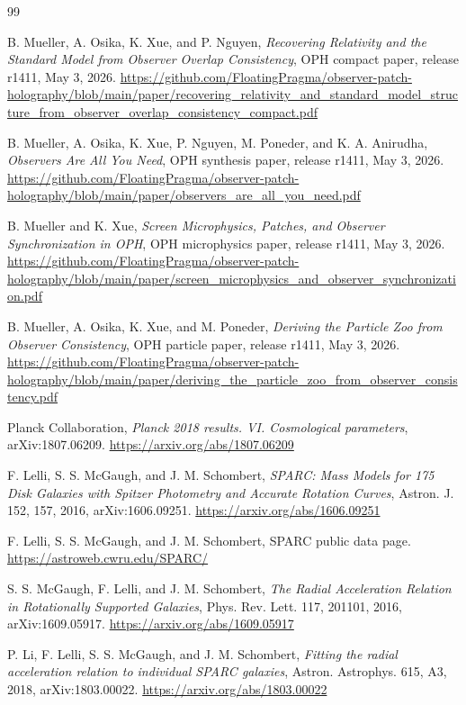 \documentclass[11pt]{article}
\begin{document}
\begin{thebibliography}{99}

B. Mueller, A. Osika, K. Xue, and P. Nguyen,
\emph{Recovering Relativity and the Standard Model from Observer Overlap Consistency},
OPH compact paper, release r1411, May 3, 2026.
\url{https://github.com/FloatingPragma/observer-patch-holography/blob/main/paper/recovering_relativity_and_standard_model_structure_from_observer_overlap_consistency_compact.pdf}

B. Mueller, A. Osika, K. Xue, P. Nguyen, M. Poneder, and K. A. Anirudha,
\emph{Observers Are All You Need}, OPH synthesis paper, release r1411,
May 3, 2026.
\url{https://github.com/FloatingPragma/observer-patch-holography/blob/main/paper/observers_are_all_you_need.pdf}

B. Mueller and K. Xue,
\emph{Screen Microphysics, Patches, and Observer Synchronization in OPH},
OPH microphysics paper, release r1411, May 3, 2026.
\url{https://github.com/FloatingPragma/observer-patch-holography/blob/main/paper/screen_microphysics_and_observer_synchronization.pdf}

B. Mueller, A. Osika, K. Xue, and M. Poneder,
\emph{Deriving the Particle Zoo from Observer Consistency},
OPH particle paper, release r1411, May 3, 2026.
\url{https://github.com/FloatingPragma/observer-patch-holography/blob/main/paper/deriving_the_particle_zoo_from_observer_consistency.pdf}

Planck Collaboration,
\emph{Planck 2018 results. VI. Cosmological parameters},
arXiv:1807.06209.
\url{https://arxiv.org/abs/1807.06209}

F. Lelli, S. S. McGaugh, and J. M. Schombert,
\emph{SPARC: Mass Models for 175 Disk Galaxies with Spitzer Photometry and Accurate Rotation Curves},
Astron. J. 152, 157, 2016, arXiv:1606.09251.
\url{https://arxiv.org/abs/1606.09251}

F. Lelli, S. S. McGaugh, and J. M. Schombert,
SPARC public data page.
\url{https://astroweb.cwru.edu/SPARC/}

S. S. McGaugh, F. Lelli, and J. M. Schombert,
\emph{The Radial Acceleration Relation in Rotationally Supported Galaxies},
Phys. Rev. Lett. 117, 201101, 2016, arXiv:1609.05917.
\url{https://arxiv.org/abs/1609.05917}

P. Li, F. Lelli, S. S. McGaugh, and J. M. Schombert,
\emph{Fitting the radial acceleration relation to individual SPARC galaxies},
Astron. Astrophys. 615, A3, 2018, arXiv:1803.00022.
\url{https://arxiv.org/abs/1803.00022}


\end{thebibliography}
\end{document}
